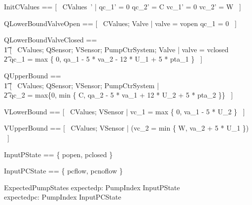 \documentclass{report} %
\begin{document}
\begin{zed}
  InitCValues == [~ CValues~' | qc\_1' = 0 \land qc\_2' = C \land vc\_1' = 0 \land vc\_2' = W ~]
\end{zed}

\begin{zed}
  QLowerBoundValveOpen == [~ CValues; Valve | valve = vopen \land qc\_1 = 0 ~]
\end{zed}

\begin{zed}
  QLowerBoundValveClosed ==
  \\ %
  \t1 [~ CValues; QSensor; VSensor; PumpCtrSystem; Valve | valve = vclosed \land \\
     \t2 qc\_1 = max \{ 0, qa\_1 - 5 * va\_2 - 12 * U\_1 + 5 * pta\_1 \} ~]
\end{zed}

\begin{zed}
  QUpperBound ==
  \\ %
  \t1 [~ CValues; QSensor; VSensor; PumpCtrSystem | \\ %
    \t2 qc\_2 = max\{0, min \{ C, qa\_2 - 5 * va\_1 + 12 * U\_2 + 5 * pta\_2 \}\} ~]
\end{zed}

\begin{zed}
  VLowerBound == [~ CValues; VSensor | vc\_1 = max \{ 0, va\_1 - 5 * U\_2 \} ~]
\end{zed}

\begin{zed}
  VUpperBound == [~ CValues; VSensor | (vc\_2 = min \{ W, va\_2 + 5 * U\_1 \}) ~]
\end{zed}

\begin{zed}
  InputPState == \{ popen, pclosed \}
\end{zed}

\begin{zed}
  InputPCState == \{ pcflow, pcnoflow \}
\end{zed}

\begin{schema}{ExpectedPumpStates}
  expectedp: PumpIndex \fun InputPState
  \\ %
  expectedpc: PumpIndex \fun InputPCState
\end{schema}
\end{document}
